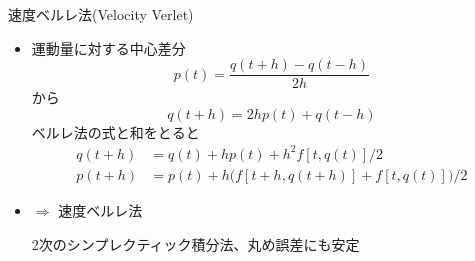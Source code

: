 \begin{frame}[t,fragile]{速度ベルレ法(Velocity Verlet)}
  \begin{itemize}
  \item 運動量に対する中心差分
    \[
    p(t) = \frac{q(t+h)-q(t-h)}{2h}
    \]
    から
    \[
    q(t+h) = 2hp(t) + q(t-h)
    \]
    ベルレ法の式と和をとると
    \begin{align*}
      q(t + h) &= q(t) + hp(t) + h^2 f[t,q(t)] / 2 \\
      p(t + h) &= p(t) + h \Big( f[t+h,q(t+h)]  + f[t,q(t)] \Big) / 2
    \end{align*}
  \item $\Rightarrow$ 速度ベルレ法

    2次のシンプレクティック積分法、丸め誤差にも安定
  \end{itemize}
\end{frame}
